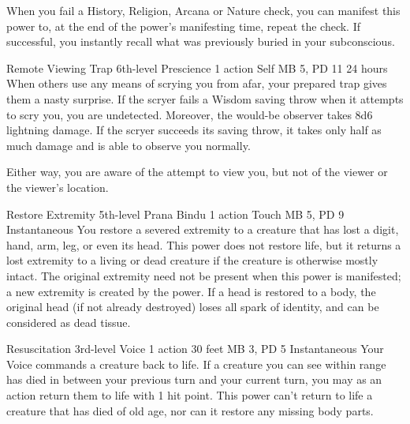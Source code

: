 When you fail a History, Religion, Arcana or Nature check,
you can manifest this power to, at the end of the power's
manifesting time, repeat the check. If successful, you instantly
recall what was previously buried in your subconscious.

\DndPowerHeader%
    {Remote Viewing Trap\label{pwr:remote_viewing_trap}}
    {6th-level Prescience}
    {1 action}
    {Self}
    {MB 5, PD 11}
    {24 hours}
When others use any means of scrying you
from afar, your prepared trap gives them a nasty surprise.
If the scryer fails a Wisdom saving throw when it attempts
to scry you, you are undetected. Moreover, the would-be observer
takes 8d6 lightning damage. If the scryer succeeds its saving
throw, it takes only half as much damage and is able to observe
you normally.

Either way, you are aware of the attempt to view you, but
not of the viewer or the viewer's location.

\DndPowerHeader%
    {Restore Extremity\label{pwr:restore_extremity}}
    {5th-level Prana Bindu}
    {1 action}
    {Touch}
    {MB 5, PD 9}
    {Instantaneous}
You restore a severed extremity to a creature
that has lost a digit, hand, arm, leg, or even its head. This
power does not restore life, but it returns a lost extremity
to a living or dead creature if the creature is otherwise
mostly intact. The original extremity need not be present
when this power is manifested; a new extremity is created
by the power. If a head is restored to a body, the original
head (if not already destroyed) loses all spark of identity,
and can be considered as dead tissue.

\DndPowerHeader%
    {Resuscitation\label{pwr:resuscitation}}
    {3rd-level Voice}
    {1 action}
    {30 feet}
    {MB 3, PD 5}
    {Instantaneous}
Your Voice commands a creature back to life.
If a creature you can see within range has died in between
your previous turn and your current turn, you may as an action
return them to life with 1 hit point. This power can't return
to life a creature that has died of old age, nor can it restore
any missing body parts.

